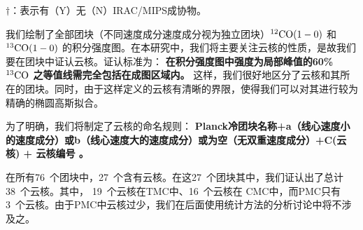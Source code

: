\documentclass[UTF8, nocolorlinks]{pkuthss}
\newcommand{\cob}{$\rm ^{13}CO$ }
\newcommand{\coaa}{$\rm^{12}CO(1-0)$ }
\newcommand{\cobb}{$\rm^{13}CO(1-0)$ }
\newcommand{\numcore}{38\ }
\newcommand{\numcoretmc}{19\ }
\newcommand{\numcorepmc}{3\ }
\newcommand{\numcorecmc}{16\ }
\newcommand{\numcompofcores}{27\ }
\newcommand{\numvelcomp}{76\ }
\begin{document}
		\label{Tab.SourceList}
			\begin{footnotesize}
			\begin{center}
			\setlength{\tabcolsep}{0.04in}
			\tablelasttail{\hline\bottomrule}
			\begin{supertabular}{lllcccclr}
			
			\end{supertabular}		
			\end{center}
			$\dagger$：表示有（Y）无（N）IRAC/MIPS成协物。
			\end{footnotesize}

		我们绘制了全部团块（不同速度成分速度成分视为独立团块）\coaa 和 \cobb 的积分强度图。在本研究中，我们将主要关注云核的性质，是故我们要在团块中证认云核。证认标准为：
		\textbf{在积分强度图中强度为局部峰值的60\% \cob 之等值线需完全包括在成图区域内。}
		这样，我们很好地区分了云核和其所在的团块。同时，由于这样定义的云核有清晰的界限，使得我们可以对其进行较为精确的椭圆高斯拟合。

		为了明确，我们将制定了云核的命名规则：
		\textbf{Planck冷团块名称+a（线心速度小的速度成分）或b（线心速度大的速度成分）或为空（无双重速度成分）+C(云核) + 云核编号 。}

		在所有\numvelcomp 个团块中，\numcompofcores 个含有云核。在这\numcompofcores 个团块其中，我们证认出了总计\numcore 个云核。其中， \numcoretmc 个云核在TMC中、\numcorecmc 个云核在 CMC中，而PMC只有\numcorepmc 个云核。由于PMC中云核过少，我们在后面使用统计方法的分析讨论中将不涉及之。
\end{document}
